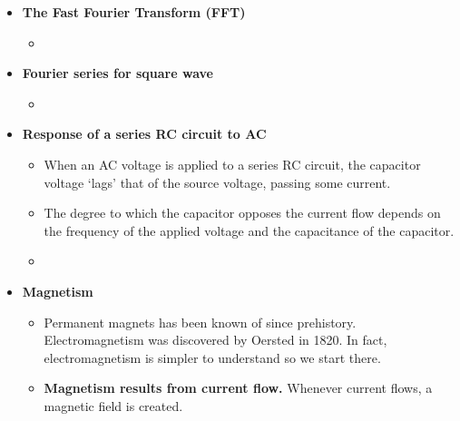 \documentclass{article}
\begin{document}
\begin{itemize}
\item \textbf{The Fast Fourier Transform (FFT)}
  \begin{itemize}
    \item 
  \end{itemize}

\item \textbf{Fourier series for square wave}
  \begin{itemize}
    \item 
  \end{itemize}

\item \textbf{Response of a series RC circuit to AC}
  \begin{itemize}
    \item When an AC voltage is applied to a series RC circuit, the capacitor
          voltage `lags' that of the source voltage, passing some current.
    \item The degree to which the capacitor opposes the current flow depends
          on the frequency of the applied voltage and the capacitance of the
          capacitor.
    \item
  \end{itemize}

\item \textbf{Magnetism}
  \begin{itemize}
    \item Permanent magnets has been known of since prehistory.
          Electromagnetism was discovered by Oersted in 1820.
          In fact, electromagnetism is simpler to understand so we start there.
    \item \textbf{Magnetism results from current flow.} Whenever current flows,
          a magnetic field is created.
  \end{itemize}


\end{itemize}
\end{document}
